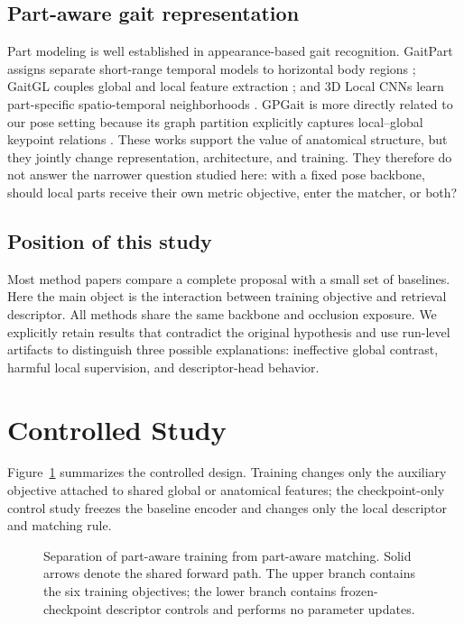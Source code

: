 \documentclass[runningheads]{llncs}
\begin{document}
\subsection{Part-aware gait representation}

Part modeling is well established in appearance-based gait recognition.
GaitPart assigns separate short-range temporal models to horizontal body
regions \cite{fan2020gaitpart}; GaitGL couples global and local feature
extraction \cite{lin2021gaitgl}; and 3D Local CNNs learn part-specific
spatio-temporal neighborhoods \cite{huang2021local}. GPGait is more directly
related to our pose setting because its graph partition explicitly captures
local--global keypoint relations \cite{fu2023gpgait}. These works support the
value of anatomical structure, but they jointly change representation,
architecture, and training. They therefore do not answer the narrower question
studied here: with a fixed pose backbone, should local parts receive their own
metric objective, enter the matcher, or both?

\subsection{Position of this study}

Most method papers compare a complete proposal with a small set of baselines.
Here the main object is the interaction between training objective and retrieval
descriptor. All methods share the same backbone and occlusion exposure. We
explicitly retain results that contradict the original hypothesis and use
run-level artifacts to distinguish three possible explanations: ineffective
global contrast, harmful local supervision, and descriptor-head behavior.

\section{Controlled Study}

Figure~\ref{fig:framework} summarizes the controlled design. Training changes
only the auxiliary objective attached to shared global or anatomical features;
the checkpoint-only control study freezes the baseline encoder and changes only
the local descriptor and matching rule.

\begin{figure}[t]
\centering
\resizebox{\textwidth}{!}{}
\caption{Separation of part-aware training from part-aware matching. Solid
arrows denote the shared forward path. The upper branch contains the six
training objectives; the lower branch contains frozen-checkpoint descriptor
controls and performs no parameter updates.}
\label{fig:framework}
\end{figure}
\end{document}
